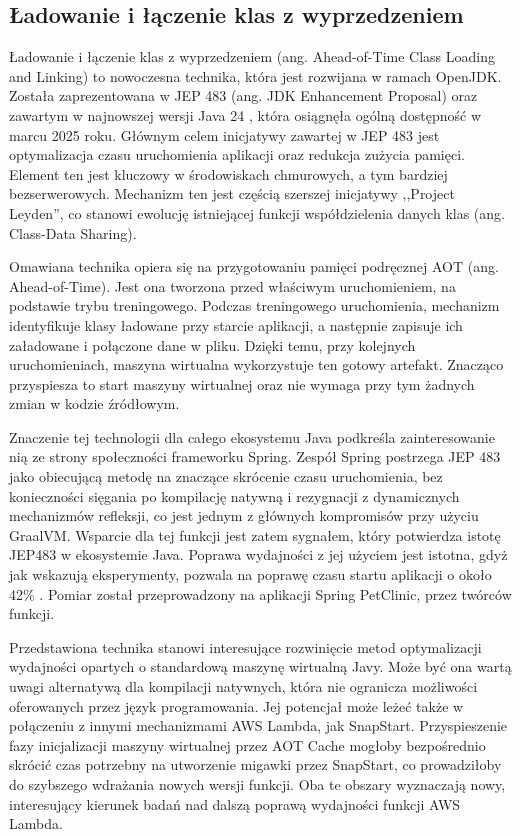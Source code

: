 \subsection*{Ładowanie i łączenie klas z wyprzedzeniem}

Ładowanie i łączenie klas z wyprzedzeniem (ang. Ahead-of-Time Class Loading and Linking) to nowoczesna technika, która jest rozwijana w ramach OpenJDK.
Została zaprezentowana w JEP 483 (ang. JDK Enhancement Proposal) oraz zawartym w najnowszej wersji Java 24 \cite{JEP483}, która osiągnęła ogólną dostępność w marcu 2025 roku.
Głównym celem inicjatywy zawartej w JEP 483 jest optymalizacja czasu uruchomienia aplikacji oraz redukcja zużycia pamięci.
Element ten jest kluczowy w środowiskach chmurowych, a tym bardziej bezserwerowych.
Mechanizm ten jest częścią szerszej inicjatywy ,,Project Leyden'', co stanowi ewolucję istniejącej funkcji współdzielenia danych klas (ang. Class-Data Sharing).

Omawiana technika opiera się na przygotowaniu pamięci podręcznej AOT (ang. Ahead-of-Time). 
Jest ona tworzona przed właściwym uruchomieniem, na podstawie trybu treningowego.
Podczas treningowego uruchomienia, mechanizm identyfikuje klasy ładowane przy starcie aplikacji, a następnie zapisuje ich załadowane i połączone dane w pliku.
Dzięki temu, przy kolejnych uruchomieniach, maszyna wirtualna wykorzystuje ten gotowy artefakt.
Znacząco przyspiesza to start maszyny wirtualnej oraz nie wymaga przy tym żadnych zmian w kodzie źródłowym.

Znaczenie tej technologii dla całego ekosystemu Java podkreśla zainteresowanie nią ze strony społeczności frameworku Spring.
Zespół Spring postrzega JEP 483 jako obiecującą metodę na znaczące skrócenie czasu uruchomienia, bez konieczności sięgania po kompilację natywną i rezygnacji z dynamicznych mechanizmów refleksji, co jest jednym z głównych kompromisów przy użyciu GraalVM.
Wsparcie dla tej funkcji \cite{spring-aot-docs} jest zatem sygnałem, który potwierdza istotę JEP483 w ekosystemie Java.
Poprawa wydajności z jej użyciem jest istotna, gdyż jak wskazują eksperymenty, pozwala na poprawę czasu startu aplikacji o około 42\% \cite{JEP483}.
Pomiar został przeprowadzony na aplikacji Spring PetClinic, przez twórców funkcji.

Przedstawiona technika stanowi interesujące rozwinięcie metod optymalizacji wydajności opartych o standardową maszynę wirtualną Javy.
Może być ona wartą uwagi alternatywą dla kompilacji natywnych, która nie ogranicza możliwości oferowanych przez język programowania.
Jej potencjał może leżeć także w połączeniu z innymi mechanizmami AWS Lambda, jak SnapStart.
Przyspieszenie fazy inicjalizacji maszyny wirtualnej przez AOT Cache mogłoby bezpośrednio skrócić czas potrzebny na utworzenie migawki przez SnapStart, co prowadziłoby do szybszego wdrażania nowych wersji funkcji.
Oba te obszary wyznaczają nowy, interesujący kierunek badań nad dalszą poprawą wydajności funkcji AWS Lambda.

